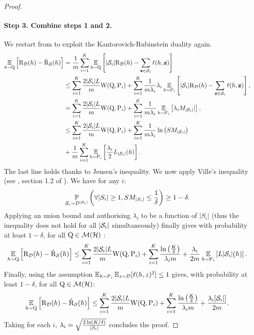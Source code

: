 \begin{noaddcontents}
\begin{proof}
    \paragraph{Step 3. Combine steps 1 and 2.}
        We restart from  to exploit the Kantorovich-Rubinstein duality again.
        \begin{align*}
            \EE_{h\sim\Q}\Big[ \Risk_{\D}(h) - \Riskhat_{\S}(h) \Big] &=  \frac{1}{m}\sum_{i=1}^{K} \EE_{h\sim\Q}\LB |\S_i|\Risk_{\D}(h) - \sum_{\z\in\S_i}\loss(h, \z) \RB\nonumber\\
            &\le \sum_{i=1}^{K} \frac{2|\S_i|L}{m}\W(\Q, \P_i) + \sum_{i=1}^{K} \frac{1}{m\lambda_i}\lambda_i\EE_{h\sim\P_i} \LB |\S_i|\Risk_{\D}(h) - \sum_{\z\in\S_i} \loss(h, \z) \RB, \\
            & = \sum_{i=1}^{K} \frac{2|\S_i|L}{m}\W(\Q, \P_i) + \sum_{i=1}^{K} \frac{1}{m\lambda_i}\EE_{h\sim\P_i} \LB \lambda_i M_{|\S_i|}| \RB, \\
            &\le   \sum_{i=1}^{K} \frac{2|\S_i|L}{m}\W(\Q, \P_i) + \sum_{i=1}^{K} \frac{1}{m\lambda_i} \ln\left( SM_{|\S_i|}  \right) \\
            & + \frac{1}{m}\sum_{i=1}^K \EE_{h\sim\P_i}\LB\frac{\lambda_i}{2} L_{|\S_i|}(h) \RB.
        \end{align*}
        The last line holds thanks to Jensen's inequality.
        We now apply Ville's inequality (see \eg, section 1.2 of \cite{haddouche2023pac}). We have for any $i$: 
        \begin{align*}
        \PP_{\S_i \sim \D^{|\S_i|}}\left( \forall |S_i|\geq 1, SM_{|S_i|} \leq \frac{1}{\delta}  \right) \geq 1-\delta.
        \end{align*}
        Applying an union bound and authorising $\lambda_i$ to be a function of $|S_i|$ (thus the inequality does not hold for all $|\S_i|$ simultaneously) finally gives with probability at least $1-\delta$, for all $\Q\in \Mcal(\H)$ :
        \begin{align*}
             \EE_{h\sim\Q}\Big[ \Risk_{\D}(h) - \Riskhat_{\S}(h) \Big] \leq    \sum_{i=1}^{K} \frac{2|\S_i|L}{m}\W(\Q, \P_i) + \sum_{i=1}^{K}   \frac{\ln\left( \frac{K}{\delta}  \right)}{\lambda_i m} + \frac{\lambda_i}{2m}\EE_{h\sim\P_i}\LB L{|\S_i|}(h) \RB.
        \end{align*}
        Finally, using the assumption $\EE_{h\sim \P_i}\EE_{z\sim \D}[\loss(h,z)^2] \leq 1$ gives, with probability at least $1-\delta$, for all $\Q\in \Mcal(\H)$:
        \begin{align*}
             \EE_{h\sim\Q}\Big[ \Risk_{\D}(h) - \Riskhat_{\S}(h) \Big] \leq    \sum_{i=1}^{K} \frac{2|\S_i|L}{m}\W(\Q, \P_i) + \sum_{i=1}^{K}   \frac{\ln\left( \frac{K}{\delta}  \right)}{\lambda_i m} + \frac{\lambda_i[\S_i|]}{2m}.
        \end{align*}
        Taking for each $i$, $\lambda_i= \sqrt{\frac{2\ln(K/\delta)}{|\S_i|}}$ concludes the proof.
    \end{proof}
        

\end{noaddcontents}
